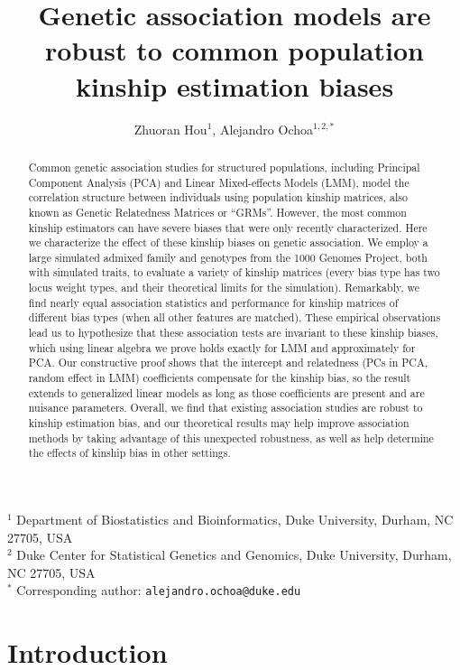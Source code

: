 \documentclass[11pt]{article}
\title{\Large \textbf{Genetic association models are robust to common population kinship estimation biases}}
\author{Zhuoran Hou$^1$, Alejandro Ochoa$^{1,2,*}$}
\date{}
\begin{document}
\maketitle

\noindent
$^1$ Department of Biostatistics and Bioinformatics, Duke University, Durham, NC 27705, USA \\
$^2$ Duke Center for Statistical Genetics and Genomics, Duke University, Durham, NC 27705, USA \\
$^*$ Corresponding author: \texttt{alejandro.ochoa@duke.edu}


\begin{abstract}
  Common genetic association studies for structured populations, including Principal Component Analysis (PCA) and Linear Mixed-effects Models (LMM), model the correlation structure between individuals using population kinship matrices, also known as Genetic Relatedness Matrices or ``GRMs''.
  However, the most common kinship estimators can have severe biases that were only recently characterized.
  Here we characterize the effect of these kinship biases on genetic association.
  We employ a large simulated admixed family and genotypes from the 1000 Genomes Project, both with simulated traits, to evaluate a variety of kinship matrices (every bias type has two locus weight types, and their theoretical limits for the simulation).
  Remarkably, we find nearly equal association statistics and performance for kinship matrices of different bias types (when all other features are matched).
  These empirical observations lead us to hypothesize that these association tests are invariant to these kinship biases, which using linear algebra we prove holds exactly for LMM and approximately for PCA.
  Our constructive proof shows that the intercept and relatedness (PCs in PCA, random effect in LMM) coefficients compensate for the kinship bias, so the result extends to generalized linear models as long as those coefficients are present and are nuisance parameters.
  Overall, we find that existing association studies are robust to kinship estimation bias, and our theoretical results may help improve association methods by taking advantage of this unexpected robustness, as well as help determine the effects of kinship bias in other settings.
\end{abstract}

\clearpage

\section{Introduction}
\end{document}
